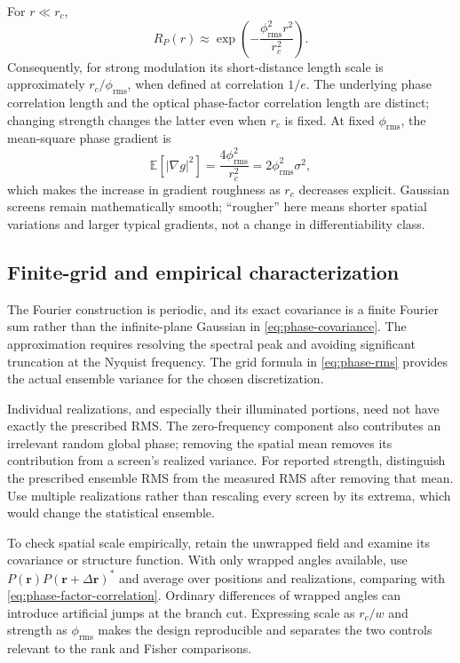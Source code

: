 \documentclass[11pt,a4paper]{article}
\newcommand{\E}{\mathbb E}
\begin{document}
For $r\ll r_c$,
\begin{equation}
 R_P(r)\approx\exp\!\left(-\frac{\phi_{\mathrm{rms}}^2 r^2}{r_c^2}\right).
\end{equation}
Consequently, for strong modulation its short-distance length scale is
approximately $r_c/\phi_{\mathrm{rms}}$, when defined at correlation $1/e$. The underlying phase correlation
length and the optical phase-factor correlation length are distinct;
changing strength changes the latter even when $r_c$ is fixed. At fixed
$\phi_{\mathrm{rms}}$, the mean-square phase gradient is
\begin{equation}
 \E[|\nabla g|^2]=\frac{4\phi_{\mathrm{rms}}^2}{r_c^2}=2\phi_{\mathrm{rms}}^2\sigma^2,
\end{equation}
which makes the increase in gradient roughness as $r_c$ decreases explicit.
Gaussian screens remain mathematically smooth; ``rougher'' here means
shorter spatial variations and larger typical gradients, not a change in
differentiability class.

\subsection{Finite-grid and empirical characterization}
The Fourier construction is periodic, and its exact covariance is a
finite Fourier sum rather than the infinite-plane Gaussian in
\eqref{eq:phase-covariance}. The approximation requires resolving the
spectral peak and avoiding significant truncation at the Nyquist frequency.
The grid formula in \eqref{eq:phase-rms} provides the actual ensemble
variance for the chosen discretization.

Individual realizations, and especially their illuminated portions, need
not have exactly the prescribed RMS. The zero-frequency component also
contributes an irrelevant random global phase; removing the spatial mean
removes its contribution from a screen's realized variance. For reported
strength, distinguish the prescribed ensemble RMS from the measured RMS
after removing that mean. Use multiple realizations rather than rescaling
every screen by its extrema, which would change the statistical ensemble.

To check spatial scale empirically, retain the unwrapped field and examine
its covariance or structure function. With only wrapped angles available,
use $P(\mathbf r)P(\mathbf r+\Delta\mathbf r)^*$ and average over positions
and realizations, comparing with \eqref{eq:phase-factor-correlation}.
Ordinary differences of wrapped angles can introduce artificial jumps at
the branch cut. Expressing scale as $r_c/w$ and strength as
$\phi_{\mathrm{rms}}$ makes the design reproducible and separates the two
controls relevant to the rank and Fisher comparisons.
\end{document}
